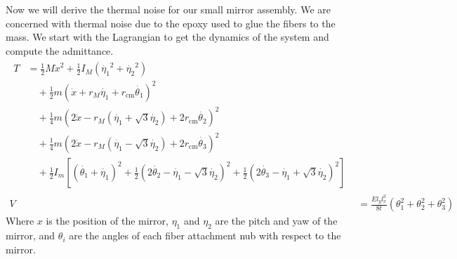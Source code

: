 Now we will derive the thermal noise for our small mirror assembly. We are
concerned with thermal noise due to the epoxy used to glue the fibers to the
mass. We start with the Lagrangian to get the dynamics of the system and
compute the admittance.
\begin{align}
\begin{split} \label{eq:fullT}
T &= \frac{1}{2} M \dot{x}^2 +
    \frac{1}{2}I_M \left( \dot{\eta_1}^2 + \dot{\eta_2}^2 \right) \\
    &\quad + \frac{1}{2} m \left(
    \dot{x} + r_M \dot{\eta_1}
    + r_{\mathrm{cm}} \dot{\theta_1} \right)^2 \\
    &\quad + \frac{1}{4} m \left(
    2 \dot{x} - r_M \left(
    \dot{\eta_1}
    + \sqrt{3} \dot{\eta_2} \right)
    + 2r_{\mathrm{cm}} \dot{\theta_2} \right)^2 \\
    &\quad + \frac{1}{4} m \left(
    2 \dot{x} - r_M \left(
    \dot{\eta_1}
    - \sqrt{3} \dot{\eta_2} \right)
    + 2r_{\mathrm{cm}} \dot{\theta_3} \right)^2 \\
    &\quad + \frac{1}{2} I_m \left[
    \left( \dot{\theta_1} + \dot{\eta_1} \right)^2
    + \frac{1}{2} \left( 2\dot{\theta_2} - \dot{\eta_1} - \sqrt{3} \dot{\eta_2} \right)^2
    + \frac{1}{2} \left( 2\dot{\theta_3} - \dot{\eta_1} + \sqrt{3} \dot{\eta_2} \right)^2
    \right]
\end{split} \\
\label{eq:fullV}
V &= \frac{E l_y l_x^3}{8t} \left( \theta_1^2 + \theta_2^2 + \theta_3^2 \right)
\end{align}
Where $x$ is the position of the mirror, $\eta_1$ and $\eta_2$ are the pitch and yaw
of the mirror, and $\theta_i$ are the angles of each fiber attachment nub with
respect to the mirror.


